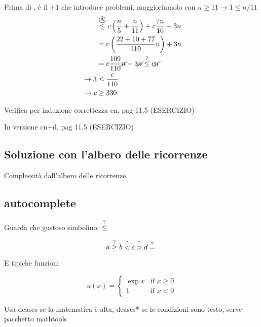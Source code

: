 \begin{description}
        Prima di , è il $+1$ che introduce problemi, maggioriamolo con $n \geq 11 \rightarrow 1 \leq n/11$
        \begin{equation*}
            \begin{split}
                \hphantom{T(n)} &
                \overset{\mbox{\textcircled{\footnotesize A}}}{\leq} c \left( \frac{n}{5}+\frac{n}{11} \right) + c \frac{7n}{10} + 3n \\
                &=c \left( \frac{22+10+77}{110}n \right) + 3n \\
                &= c \frac{109}{110} \cancel{n}+  3\cancel{n} \overset{?}{\leq} c\cancel{n}\\
                \rightarrow 3 & \leq \frac{c}{110} \\
                \rightarrow c & \geq 330 \\
            \end{split}
        \end{equation*}
\end{description}

Verifica per induzione correttezza cn, pag 11.5 (ESERCIZIO)

In versione cn+d, pag 11.5 (ESERCIZIO)

\subsection{Soluzione con l'albero delle ricorrenze}
Complessità dall'albero delle ricorrenze

\subsection{autocomplete}

Guarda che gustoso simbolino: $ \overset{?}{\leq}{} $

\[
    a \overset{?}{\geq}{} b \overset{?}{<}{} c \overset{?}{>}{} d \overset{?}{=}{} 
\]

E tipiche funzioni

\[
    u(x) = 
    \begin{cases} 
        \exp{x} & \text{if } x \geq 0 \\
        1       & \text{if } x < 0
    \end{cases}
\]

Usa dcases se la matematica è alta, dcases* se le condizioni sono testo, serve pacchetto mathtools

